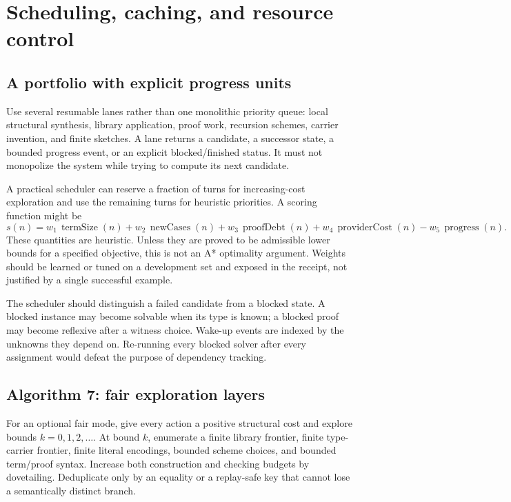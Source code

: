 \documentclass[11pt,letterpaper]{article}
\theoremstyle{definition}\newtheorem{definition}[theorem]{Definition}
\theoremstyle{remark}\newtheorem{remark}[theorem]{Remark}
\begin{document}
\section{Scheduling, caching, and resource control}
\label{sec:scheduling}

\subsection{A portfolio with explicit progress units}

Use several resumable lanes rather than one monolithic priority queue: local
structural synthesis, library application, proof work, recursion schemes,
carrier invention, and finite sketches. A lane returns a candidate, a successor
state, a bounded progress event, or an explicit blocked/finished status. It must
not monopolize the system while trying to compute its next candidate.

A practical scheduler can reserve a fraction of turns for increasing-cost
exploration and use the remaining turns for heuristic priorities. A scoring
function might be
\[
 s(n)=w_1\,\operatorname{termSize}(n)+w_2\,\operatorname{newCases}(n)
       +w_3\,\operatorname{proofDebt}(n)+w_4\,\operatorname{providerCost}(n)
       -w_5\,\operatorname{progress}(n).
\]
These quantities are heuristic. Unless they are proved to be admissible lower
bounds for a specified objective, this is not an A* optimality argument.
Weights should be learned or tuned on a development set and exposed in the
receipt, not justified by a single successful example.

The scheduler should distinguish a failed candidate from a blocked state. A
blocked instance may become solvable when its type is known; a blocked proof may
become reflexive after a witness choice. Wake-up events are indexed by the
unknowns they depend on. Re-running every blocked solver after every assignment
would defeat the purpose of dependency tracking.

\subsection{Algorithm 7: fair exploration layers}

For an optional fair mode, give every action a positive structural cost and
explore bounds $k=0,1,2,\ldots$. At bound $k$, enumerate a finite library frontier,
finite type-carrier frontier, finite literal encodings, bounded scheme choices,
and bounded term/proof syntax. Increase both construction and checking budgets
by dovetailing. Deduplicate only by an equality or a replay-safe key that cannot
lose a semantically distinct branch.
\end{document}
